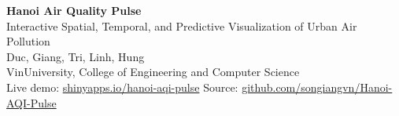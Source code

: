 \documentclass[a4paper]{article}
\begin{document}
\begin{center}
    {\LARGE \textbf{\color{DarkRed} Hanoi Air Quality Pulse}}\\[2pt]
    {\large Interactive Spatial, Temporal, and Predictive Visualization of Urban Air Pollution}\\[8pt]
    {\normalsize Duc, Giang, Tri, Linh, Hung}\\[2pt]
    {\small VinUniversity, College of Engineering and Computer Science}\\[2pt]
    {\small Live demo: \href{https://giangnguyenson.shinyapps.io/hanoi-aqi-pulse/}{shinyapps.io/hanoi-aqi-pulse}
    \quad\textbar\quad
    Source: \href{https://github.com/songiangvn/Hanoi-AQI-Pulse}{github.com/songiangvn/Hanoi-AQI-Pulse}}
\end{center}



\end{document}
